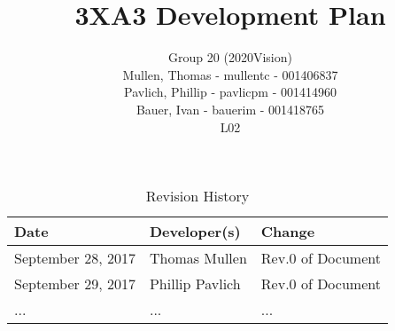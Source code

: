 \documentclass[12pt]{article}
\title{3XA3 Development Plan}
\author{Group 20 (2020Vision)\\
Mullen, Thomas - mullentc - 001406837\\
Pavlich, Phillip - pavlicpm - 001414960\\
Bauer, Ivan - bauerim - 001418765\\
L02}
\date{}
\begin{document}
\begin{table}[hp]
\caption{Revision History} \label{TblRevisionHistory}
\begin{tabularx}{\textwidth}{XXl}
\toprule
\textbf{Date} & \textbf{Developer(s)} & \textbf{Change}\\
\midrule
September 28, 2017 & Thomas Mullen & Rev.0 of Document\\
September 29, 2017 & Phillip Pavlich & Rev.0 of Document\\
... & ... & ...\\
\bottomrule
\end{tabularx}
\end{table}
\newpage


\maketitle
\newpage
\end{document}
